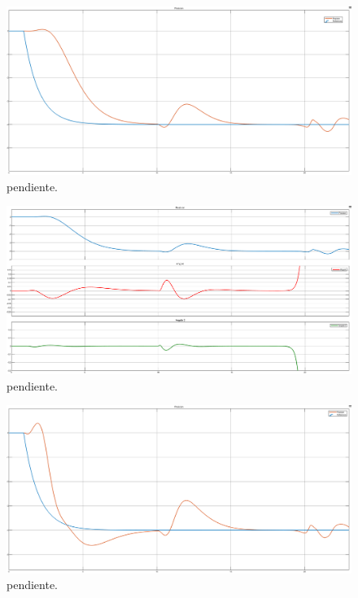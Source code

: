%
%
%

\begin{figure}[H]
	\centering
	\includegraphics[width=\linewidth]{../Analisis de Resultados/ImagenesAnalisis de Resultados/realim_posref.png}
	\caption{pendiente.}	
	\label{fig:realim_posref}
\end{figure}

\begin{figure}[H]
	\centering
	\includegraphics[width=\linewidth]{../Analisis de Resultados/ImagenesAnalisis de Resultados/realim_vars.png}
	\caption{pendiente.}	
	\label{fig:realim_vars}
\end{figure}


\begin{figure}[H]
	\centering
	\includegraphics[width=\linewidth]{../Analisis de Resultados/ImagenesAnalisis de Resultados/obsv_posref.png}
	\caption{pendiente.}	
	\label{fig:obsv_posref}
\end{figure}

